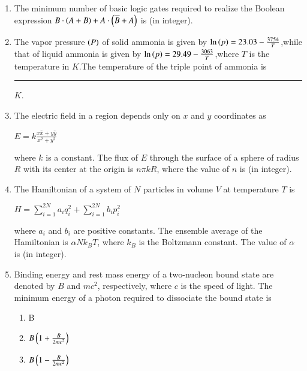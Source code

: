 \documentclass[journal]{IEEEtran}
\begin{document}
\begin{enumerate}
\begin{enumerate}
\end{enumerate}
\item The minimum number of basic logic gates required to realize the Boolean expression $B \cdot\left(A+B\right)+A\cdot\left(\overline{B}+A\right)$  is \underline{\hspace{2cm}} (in integer).\\
\item The vapor pressure $\left(P\right)$ of solid ammonia is given by $\ln{\ensuremath{\left(p\right)}}=23.03-\frac{3754}{T}$,while that of liquid ammonia is given by $\ln{\ensuremath{\left(p\right)}}=29.49-\frac{3063}{T}$,where $T$ is the temperature in $K$.The temperature of the triple point of ammonia is \rule{2cm}{0.4pt} $K$. \\
\item The electric field in a region depends only on $x$ and $y$ coordinates as
\begin{center}
 $E = k\frac{x\hat{x}+y\hat{y}}{x^2 + y^2}$   
\end{center}
where $k$ is a constant. The flux of $E$ through the surface of a sphere of radius $R$ with its center at the origin is $n \pi k R$, where the value of $n$ is \underline{\hspace{1cm}} (in integer).\\
\item The Hamiltonian of a system of $N$ particles in volume $V$ at temperature $T$ is
\begin{center}
$H = \sum_{i=1}^{2N} a_i q_i^2 + \sum_{i=1}^{2N} b_i p_i^2$
\end{center}
where $a_i$ and $b_i$ are positive constants. The ensemble average of the Hamiltonian is $\alpha N k_B T$, where $k_B$ is the Boltzmann constant. The value of $\alpha$ is \underline{\hspace{1cm}} (in integer).
\newpage
\item Binding energy and rest mass energy of a two-nucleon bound state are denoted by $ B$  and  $mc^2$, respectively, where $c$ is the speed of light. The minimum energy of a photon required to dissociate the bound state is
\begin{enumerate}
\item B
\item $B\left( 1 + \frac{B}{2mc^2}\right)$
\item $B\left(1 - \frac{B}{2mc^2}\right)$

\end{enumerate}
\end{enumerate}
\end{document}
